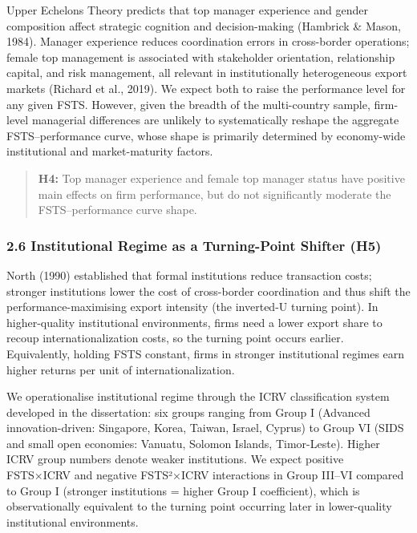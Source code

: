 \documentclass[
  12pt,a4paper]{article}
\begin{document}
Upper Echelons Theory predicts that top manager experience and gender
composition affect strategic cognition and decision-making (Hambrick \&
Mason, 1984). Manager experience reduces coordination errors in
cross-border operations; female top management is associated with
stakeholder orientation, relationship capital, and risk management, all
relevant in institutionally heterogeneous export markets (Richard et
al., 2019). We expect both to raise the performance level for any given
FSTS. However, given the breadth of the multi-country sample, firm-level
managerial differences are unlikely to systematically reshape the
aggregate FSTS--performance curve, whose shape is primarily determined
by economy-wide institutional and market-maturity factors.

\begin{quote}
\textbf{H4:} Top manager experience and female top manager status have
positive main effects on firm performance, but do not significantly
moderate the FSTS--performance curve shape.
\end{quote}

\hypertarget{institutional-regime-as-a-turning-point-shifter-h5}{%
\subsubsection{2.6 Institutional Regime as a Turning-Point Shifter
(H5)}\label{institutional-regime-as-a-turning-point-shifter-h5}}

North (1990) established that formal institutions reduce transaction
costs; stronger institutions lower the cost of cross-border coordination
and thus shift the performance-maximising export intensity (the
inverted-U turning point). In higher-quality institutional environments,
firms need a lower export share to recoup internationalization costs, so
the turning point occurs earlier. Equivalently, holding FSTS constant,
firms in stronger institutional regimes earn higher returns per unit of
internationalization.

We operationalise institutional regime through the ICRV classification
system developed in the dissertation: six groups ranging from Group I
(Advanced innovation-driven: Singapore, Korea, Taiwan, Israel, Cyprus)
to Group VI (SIDS and small open economies: Vanuatu, Solomon Islands,
Timor-Leste). Higher ICRV group numbers denote weaker institutions. We
expect positive FSTS×ICRV and negative FSTS²×ICRV interactions in Group
III--VI compared to Group I (stronger institutions = higher Group I
coefficient), which is observationally equivalent to the turning point
occurring later in lower-quality institutional environments.
\end{document}
